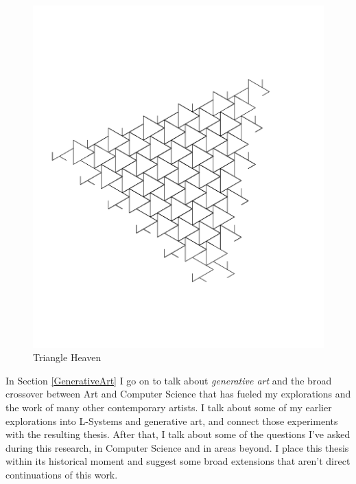 \documentclass[12pt,twoside]{reedthesis}
\begin{document}
	\begin{figure}[h]
	\centering
	\includegraphics[clip=true, viewport=0.5in 2in 9.5in 10in, scale=0.4]{Images/ThePathWeWillFollow2}
	\caption[Triangle Heaven]{Triangle Heaven\footnotemark}
	\label {Motivations3}
	\end{figure}
	
	In Section \ref{GenerativeArt} I go on to talk about \textit{generative art} and the broad crossover between Art and Computer Science that has fueled my explorations and the work of many other contemporary artists. I talk about some of my earlier explorations into L-Systems and generative art, and connect those experiments with the resulting thesis. After that, I talk about some of the questions I've asked during this research, in Computer Science and in areas beyond. I place this thesis within its historical moment and suggest some broad extensions that aren't direct continuations of this work.
	
\end{document}
